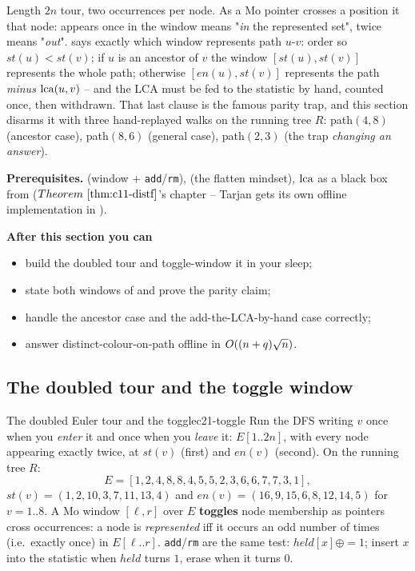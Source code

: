 \begin{topicintro}
Length \(2n\) tour, two occurrences per node.  As a Mo pointer crosses a
position it  that node: appears once in the window means
"\emph{in} the represented set", twice means "\emph{out}".  
says exactly which window represents path \(u\)-\(v\): order so
\(st(u)<st(v)\); if \(u\) is an ancestor of \(v\) the window \([st(u),st(v)]\)
represents the whole path; otherwise \([en(u),st(v)]\) represents the path
\emph{minus} \(\operatorname{lca}(u,v)\) -- and the LCA must be fed to the statistic by hand,
counted once, then withdrawn.  That last clause is the famous parity trap, and
this section disarms it with three hand-replayed walks on the running tree \(R\):
path\((4,8)\) (ancestor case), path\((8,6)\) (general case), path\((2,3)\) (the
trap \emph{changing an answer}).

\textbf{Prerequisites.}  (window + \texttt{add}/\texttt{rm}),
 (the flatten mindset), \(\operatorname{lca}\) as a black box from
 (\(\thmref{c11-distf}\)'s chapter -- Tarjan gets its own offline
implementation in ).

\textbf{After this section you can}
\begin{itemize}[nosep]
  \item build the doubled tour and toggle-window it in your sleep; \hfill{}
  \item state both windows of  and prove the parity claim; \hfill{}
  \item handle the ancestor case and the add-the-LCA-by-hand case correctly; \hfill{}
  \item answer distinct-colour-on-path offline in \(O((n+q)\sqrt n)\). \hfill{}
\end{itemize}
\end{topicintro}

\subsection{The doubled tour and the toggle window}

\begin{definition}{The doubled Euler tour and the toggle}{c21-toggle}
Run the DFS writing \(v\) once when you \emph{enter} it and once when you
\emph{leave} it: \(E[1..2n]\), with every node appearing exactly twice, at
\(st(v)\) (first) and \(en(v)\) (second).  On the running tree \(R\):
\[
  E=[1,2,4,8,8,4,5,5,2,3,6,6,7,7,3,1],
\]
\(st(v)=(1,2,10,3,7,11,13,4)\) and \(en(v)=(16,9,15,6,8,12,14,5)\) for
\(v=1..8\).  A Mo window \([\ell,r]\) over \(E\) \textbf{toggles} node membership
as pointers cross occurrences: a node is \emph{represented} iff it occurs an
odd number of times (i.e.\ exactly once) in \(E[\ell..r]\).  \texttt{add}/\texttt{rm}
are the same test: \(\mathit{held}[x] \oplus= 1\); insert \(x\) into the
statistic when \(\mathit{held}\) turns \(1\), erase when it turns \(0\).
\end{definition}

